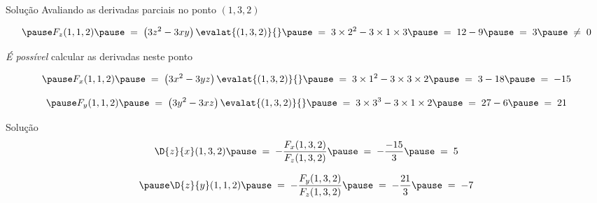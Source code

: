 \begin{resolution}{Solução}
  Avaliando as derivadas parciais no ponto \((1, 3, 2)\)

  \[
    \pause
    F_z(1, 1, 2)
    \pause
    \;=\; \left(3z^2 - 3xy\right)\evalat{(1, 3, 2)}{}
    \pause
    \;=\; 3\times 2^2 - 3 \times 1 \times 3
    \pause
    \;=\; 12 - 9
    \pause
    \;=\; 3
    \pause
    \;\neq\; 0
  \]

  \pause
  \emph{É possível} calcular as derivadas neste ponto

  \[
    \pause
    F_x(1, 1, 2)
    \pause
    \;=\; \left(3x^2 - 3yz\right)\evalat{(1, 3, 2)}{}
    \pause
    \;=\; 3 \times 1^2 - 3 \times 3 \times 2
    \pause
    \;=\; 3 - 18
    \pause
    \;=\; -15
  \]

  \[
    \pause
    F_y(1, 1, 2)
    \pause
    \;=\; \left(3y^2 - 3xz\right)\evalat{(1, 3, 2)}{}
    \pause
    \;=\; 3 \times 3^3 - 3 \times1 \times 2
    \pause
    \;=\; 27 - 6
    \pause
    \;=\; 21
  \]
\end{resolution}

\begin{resolution}{Solução}
  \[
    \D{z}{x}(1, 3, 2)
    \pause
    \;=\; -\frac{F_x(1, 3, 2)}{F_z(1, 3, 2)}
    \pause
    \;=\; -\frac{-15}{3}
    \pause
    \;=\; 5
  \]

  \[
    \pause
    \D{z}{y}(1, 1, 2)
    \pause
    \;=\; -\frac{F_y(1, 3, 2)}{F_z(1, 3, 2)}
    \pause
    \;=\; -\frac{21}{3}
    \pause
    \;=\; -7
  \]
\end{resolution}

